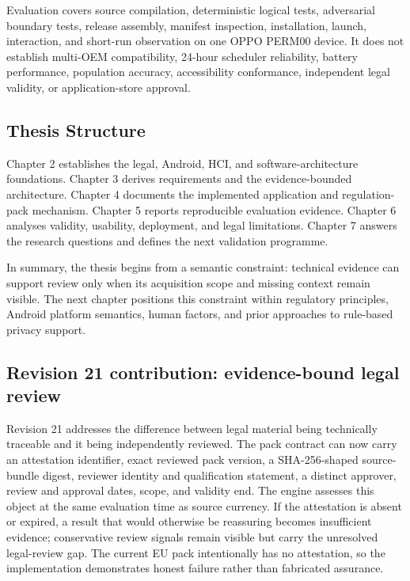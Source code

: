 Evaluation covers source compilation, deterministic logical tests, adversarial boundary tests, release assembly, manifest inspection, installation, launch, interaction, and short-run observation on one OPPO PERM00 device. It does not establish multi-OEM compatibility, 24-hour scheduler reliability, battery performance, population accuracy, accessibility conformance, independent legal validity, or application-store approval.

\subsection{Thesis Structure}

Chapter 2 establishes the legal, Android, HCI, and software-architecture foundations. Chapter 3 derives requirements and the evidence-bounded architecture. Chapter 4 documents the implemented application and regulation-pack mechanism. Chapter 5 reports reproducible evaluation evidence. Chapter 6 analyses validity, usability, deployment, and legal limitations. Chapter 7 answers the research questions and defines the next validation programme.

In summary, the thesis begins from a semantic constraint: technical evidence can support review only when its acquisition scope and missing context remain visible. The next chapter positions this constraint within regulatory principles, Android platform semantics, human factors, and prior approaches to rule-based privacy support.
\subsection{Revision 21 contribution: evidence-bound legal review}

Revision 21 addresses the difference between legal material being technically traceable and it being independently reviewed. The pack contract can now carry an attestation identifier, exact reviewed pack version, a SHA-256-shaped source-bundle digest, reviewer identity and qualification statement, a distinct approver, review and approval dates, scope, and validity end. The engine assesses this object at the same evaluation time as source currency. If the attestation is absent or expired, a result that would otherwise be reassuring becomes insufficient evidence; conservative review signals remain visible but carry the unresolved legal-review gap. The current EU pack intentionally has no attestation, so the implementation demonstrates honest failure rather than fabricated assurance.


